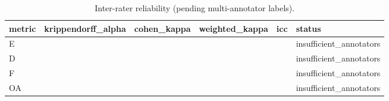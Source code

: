 \begin{table}[t]
\centering
\caption{Inter-rater reliability (pending multi-annotator labels).}
\label{tab:reliability}
\begin{tabular}{llllll}
\toprule
metric & krippendorff\_alpha & cohen\_kappa & weighted\_kappa & icc & status \\
\midrule
E &  &  &  &  & insufficient\_annotators \\
D &  &  &  &  & insufficient\_annotators \\
F &  &  &  &  & insufficient\_annotators \\
OA &  &  &  &  & insufficient\_annotators \\
\bottomrule
\end{tabular}
\end{table}
